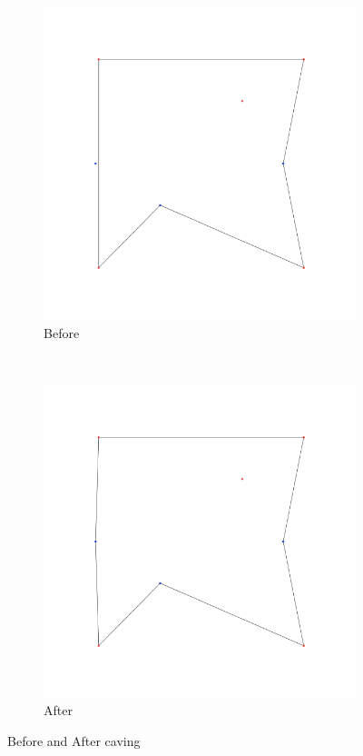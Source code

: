 \documentclass[paper=a4, fontsize=11pt]{scrartcl} %
\numberwithin{equation}{section} %
\numberwithin{figure}{section} %
\numberwithin{table}{section} %
\begin{document}
\begin{figure}
        \centering
        \begin{subfigure}[b]{0.5\textwidth}
                \includegraphics[width=\textwidth]{before_caving}
                \caption{Before}
                \label{fig:before}
        \end{subfigure}%
        ~ %
        \begin{subfigure}[b]{0.5\textwidth}
                \includegraphics[width=\textwidth]{after_caving}
                \caption{After}
                \label{fig:after}
        \end{subfigure}
        \caption{Before and After caving}\label{fig:caving}
\end{figure}
\end{document}
